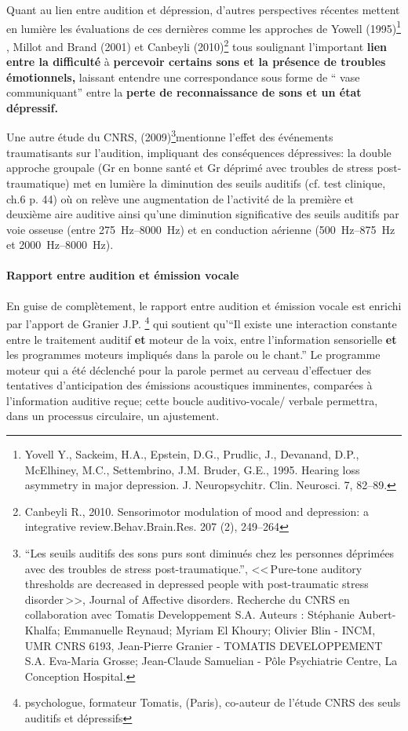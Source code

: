   

 
Quant au lien entre audition et dépression, d'autres perspectives
récentes mettent en lumière les évaluations de ces dernières comme les approches de Yowell (1995)\footnote{Yovell
  Y., Sackeim, H.A., Epstein, D.G., Prudlic, J., Devanand, D.P.,
  McElhiney, M.C., Settembrino, J.M. Bruder, G.E., 1995. Hearing loss
  asymmetry in major depression. J. Neuropsychitr. Clin. Neurosci. 7, 82--89.} , Millot and Brand (2001) et 
Canbeyli (2010)\footnote{Canbeyli R., 2010. Sensorimotor modulation of mood and
depression: a integrative review.Behav.Brain.Res. 207 (2), 249--264} tous soulignant l'important\textbf{ lien entre la difficulté}
à \textbf{percevoir certains sons et la présence de troubles émotionnels,}
laissant entendre une correspondance sous forme de `` vase communiquant''
entre la \textbf{perte de reconnaissance de
sons et un état dépressif.}

Une autre étude du CNRS, (2009)\footnote{``Les seuils auditifs des sons purs 
	sont diminués chez les personnes déprimées avec des
	troubles de stress post-traumatique.'', <<\,Pure-tone auditory 
	thresholds are decreased in depressed people with post-traumatic stress 
disorder\,>>, Journal of Affective disorders. Recherche du CNRS en collaboration
	avec Tomatis Developpement S.A. Auteurs : Stéphanie 
	Aubert-Khalfa; Emmanuelle Reynaud; Myriam El Khoury;
	Olivier Blin - INCM, UMR CNRS 6193, Jean-Pierre Granier -
	TOMATIS DEVELOPPEMENT S.A. Eva-Maria Grosse; Jean-Claude 
	Samuelian - Pôle Psychiatrie Centre, La Conception Hospital.}mentionne l'effet des événements
traumatisants sur l'audition, impliquant des conséquences dépressives:
la double approche groupale (Gr en bonne santé et Gr déprimé avec
troubles de stress post-traumatique) met en lumière la diminution des
seuils auditifs (cf. test clinique, ch.6 p. 44) où on relève une augmentation de l'activité de la
première et deuxième aire auditive ainsi qu'une diminution significative des
seuils auditifs par voie osseuse (entre
\SIrange{275}{8000}{\Hz}) et en conduction aérienne
(\SIrange{500}{875}{\Hz} et  \SIrange{2000}{8000}{\Hz}).

\paragraph{Rapport entre audition et émission vocale}

En guise de complètement, le rapport entre audition et émission vocale
est enrichi par l'apport de Granier J.P. \footnote{psychologue, formateur
Tomatis, (Paris), co-auteur de l'étude CNRS des seuls auditifs et
dépressifs}
qui soutient qu'``Il existe une 
interaction
constante entre le traitement auditif \textbf{et} moteur de la
voix, entre l'information sensorielle \textbf{et} les programmes moteurs impliqués
dans la parole ou le chant.''
Le programme moteur qui a été déclenché
pour la parole permet au cerveau d'effectuer des tentatives d'anticipation
des émissions acoustiques imminentes, comparées à l'information
auditive reçue; cette boucle
auditivo-vocale/ verbale permettra, dans un processus circulaire, un ajustement.


